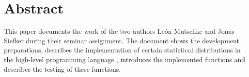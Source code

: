 
\chapter*{Abstract}

	This paper documents the work of the two authors Le\'{o}n Mutschke and Jonas Siefker during their seminar assignment. The document shows the development preparations, describes the implementation of certain statistical distributions in the high-level programming language \setlx, introduces the implemented functions and describes the testing of these functions.